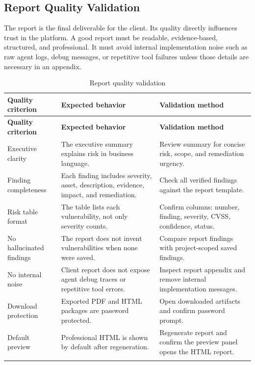 \documentclass[12pt,a4paper]{report}
\begin{document}
\subsection{Report Quality Validation}

The report is the final deliverable for the client. Its quality directly influences
trust in the platform. A good report must be readable, evidence-based, structured, and
professional. It must avoid internal implementation noise such as raw agent logs,
debug messages, or repetitive tool failures unless those details are necessary in an
appendix.

\begin{longtable}{|p{}|p{}|p{}|}
\hline
\textbf{Quality criterion} & \textbf{Expected behavior} & \textbf{Validation method} \\
\hline
\endfirsthead
\hline
\textbf{Quality criterion} & \textbf{Expected behavior} & \textbf{Validation method} \\
\hline
\endhead
Executive clarity & The executive summary explains risk in business language. & Review
summary for concise risk, scope, and remediation urgency. \\
\hline
Finding completeness & Each finding includes severity, asset, description, evidence,
impact, and remediation. & Check all verified findings against the report template. \\
\hline
Risk table format & The table lists each vulnerability, not only severity counts. &
Confirm columns: number, finding, severity, CVSS, confidence, status. \\
\hline
No hallucinated findings & The report does not invent vulnerabilities when none were
saved. & Compare report findings with project-scoped saved findings. \\
\hline
No internal noise & Client report does not expose agent debug traces or repetitive
tool errors. & Inspect report appendix and remove internal implementation messages. \\
\hline
Download protection & Exported PDF and HTML packages are password protected. & Open
downloaded artifacts and confirm password prompt. \\
\hline
Default preview & Professional HTML is shown by default after regeneration. & Regenerate
report and confirm the preview panel opens the HTML report. \\
\hline
\caption{Report quality validation}
\label{tab:report_quality_validation}
\end{longtable}
\end{document}
